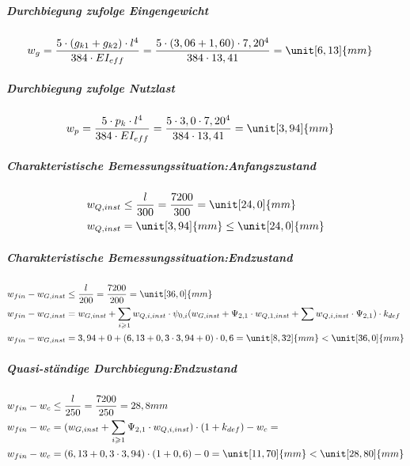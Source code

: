 \subparagraph{Durchbiegung zufolge Eingengewicht}

\begin{align*}
w_{g}&=\dfrac{5 \cdot (g_{k1}+g_{k2}) \cdot l^{4} }{384 \cdot EI_{eff} }=\dfrac{5 \cdot (3,06 + 1,60) \cdot 7,20^{4} }{384 \cdot 13,41}=\unit[6,13]{mm} 
\end{align*}

\subparagraph{Durchbiegung zufolge Nutzlast}

\begin{align*}
w_{p}&=\dfrac{5 \cdot p_{k}\cdot l^{4} }{384 \cdot EI_{eff} }=\dfrac{5 \cdot 3,0 \cdot 7,20^{4} }{384 \cdot 13,41}= \unit[3,94]{mm}
\end{align*}

\subparagraph{Charakteristische Bemessungssituation:Anfangszustand}

\begin{align*}
w_{Q,inst}&\leq\dfrac{l}{300}=\dfrac{7200}{300}=\unit[24,0]{mm}\\
w_{Q,inst}&=\unit[3,94]{mm}\leq \unit[24,0]{mm}
\end{align*}


\subparagraph{Charakteristische Bemessungssituation:Endzustand}

\begin{align*}
w_{fin}-w_{G,inst}&\leq\dfrac{l}{200}=\dfrac{7200}{200}=\unit[36,0]{mm}\\
w_{fin}-w_{G,inst}&=w_{G,inst}+\sum_{i\geqslant1} w_{Q,i,inst} \cdot \psi_{0,i}(w_{G,inst}+\Psi_{2,1} \cdot w_{Q,1,inst}+\sum w_{Q,i,inst} \cdot \Psi_{2,1}) \cdot k_{def}\\
w_{fin}-w_{G,inst}&=3,94+0+(6,13+0,3\cdot 3,94+0) \cdot 0,6=\unit[8,32]{mm} < \unit[36,0]{mm}
\end{align*}

\subparagraph{Quasi-ständige Durchbiegung:Endzustand}
\begin{align*}
w_{fin}-w_{c}&\leq\dfrac{l}{250}=\dfrac{7200}{250}=28,8mm\\
w_{fin}-w_{c}&=(w_{G,inst}+\sum_{i\geqslant1} \Psi_{2,1} \cdot w_{Q,i,inst}) \cdot (1+k_{def})-w_{c}=\\
w_{fin}-w_{c}&=(6,13+0,3 \cdot 3,94) \cdot (1+0,6)-0=\unit[11,70]{mm} < \unit[28,80]{mm}
\end{align*}






